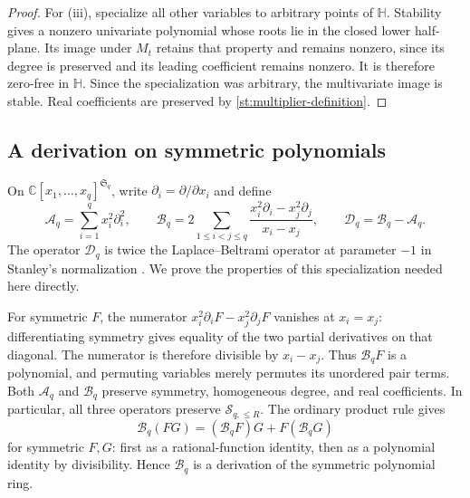 \documentclass[reqno, 12pt]{article}
\numberwithin{equation}{section}
\theoremstyle{definition}
\newcommand{\CC}{\mathbb C}
\begin{document}
\begin{proof}
For \textup{(iii)}, specialize all other variables to arbitrary
points of $\mathbb H$.  Stability gives a nonzero univariate
polynomial whose roots lie in the closed lower half-plane.
Its image under $M_t$ retains that property and remains nonzero,
since its degree is preserved and its leading coefficient remains
nonzero.
It is therefore zero-free in $\mathbb H$.  Since the specialization
was arbitrary, the multivariate image is stable. 
Real coefficients are preserved by \eqref{st:multiplier-definition}.
\end{proof}

\subsection{A derivation on symmetric polynomials}

On $\CC[x_1,\ldots,x_q]^{\mathfrak S_q}$, write
$\partial_i=\partial/\partial x_i$ and define
\begin{equation}\label{st:operators}
\mathcal A_q=\sum_{i=1}^q x_i^2\partial_i^2,\qquad
\mathcal B_q=2\sum_{1\leq i<j\leq q}\frac{x_i^2\partial_i-x_j^2\partial_j}{x_i-x_j},\qquad
\mathcal D_q=\mathcal B_q-\mathcal A_q.
\end{equation}
The operator $\mathcal D_q$ is twice the Laplace--Beltrami operator
at parameter $-1$ in Stanley's normalization
\cite[p.~84, (11)]{StanleyJack}.  We prove the properties of this
specialization needed here directly.

For symmetric $F$, the numerator
$x_i^2\partial_iF-x_j^2\partial_jF$ vanishes at $x_i=x_j$:
differentiating symmetry gives equality of the two partial
derivatives on that diagonal.  The numerator is therefore divisible
by $x_i-x_j$.  Thus $\mathcal B_qF$ is a polynomial, and
permuting variables merely permutes its unordered pair terms.
Both $\mathcal A_q$ and $\mathcal B_q$ preserve symmetry,
homogeneous degree, and real coefficients.  In particular, all
three operators preserve $\mathcal S_{q,\leq R}$.
The ordinary product rule gives
\begin{equation}\label{st:derivation-rule}
\mathcal B_q(FG)
=(\mathcal B_qF)G+F(\mathcal B_qG)
\end{equation}
for symmetric $F,G$: first as a rational-function identity, then
as a polynomial identity by divisibility.  Hence $\mathcal B_q$
is a derivation of the symmetric polynomial ring.
\end{document}
